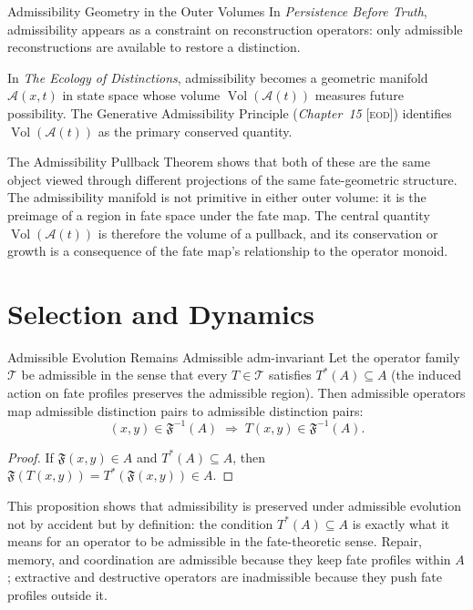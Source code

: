 \documentclass[12pt,twoside,openright]{book}
\newcommand{\adm}{\mathcal{A}}            %
\newcommand{\Vol}{\operatorname{Vol}}     %
\newcommand{\transfam}{\mathcal{T}}       %
\newcommand{\fateMap}{\mathfrak{F}}
\newcommand{\EOD}[1]{\textit{#1} [\textsc{eod}]}
\newcommand{\admRegion}{A}
\providecommand{\admRegion}{A}
\begin{document}
\begin{trilogylink}{Admissibility Geometry in the Outer Volumes}
In \textit{Persistence Before Truth}, admissibility appears as
a constraint on reconstruction operators: only admissible
reconstructions are available to restore a distinction.

In \textit{The Ecology of Distinctions}, admissibility becomes
a geometric manifold $\adm(x,t)$ in state space whose volume
$\Vol(\adm(t))$ measures future possibility. The Generative
Admissibility Principle (\EOD{Chapter~15}) identifies
$\Vol(\adm(t))$ as the primary conserved quantity.

The Admissibility Pullback Theorem shows that both of these are
the same object viewed through different projections of the
same fate-geometric structure. The admissibility manifold is
not primitive in either outer volume: it is the preimage of a
region in fate space under the fate map. The central
quantity $\Vol(\adm(t))$ is therefore the volume of a pullback,
and its conservation or growth is a consequence of the fate
map's relationship to the operator monoid.
\end{trilogylink}

\section{Selection and Dynamics}

\begin{proposition}{Admissible Evolution Remains Admissible}%
  {adm-invariant}
Let the operator family $\transfam$ be admissible in the sense
that every $T\in\transfam$ satisfies
$T^*(\admRegion)\subseteq\admRegion$ (the induced action on fate
profiles preserves the admissible region). Then admissible
operators map admissible distinction pairs to admissible
distinction pairs:
\[
  (x,y)\in\fateMap^{-1}(\admRegion)
  \;\Longrightarrow\;
  T(x,y)\in\fateMap^{-1}(\admRegion).
\]
\begin{proof}
If $\fateMap(x,y)\in\admRegion$ and $T^*(\admRegion)
\subseteq\admRegion$, then
$\fateMap(T(x,y)) = T^*(\fateMap(x,y))\in\admRegion$.
\end{proof}
\end{proposition}

This proposition shows that admissibility is preserved under
admissible evolution not by accident but by definition: the
condition $T^*(\admRegion)\subseteq\admRegion$ is exactly
what it means for an operator to be admissible in the
fate-theoretic sense. Repair, memory, and coordination are
admissible because they keep fate profiles within $\admRegion$;
extractive and destructive operators are inadmissible because
they push fate profiles outside it.
\end{document}
